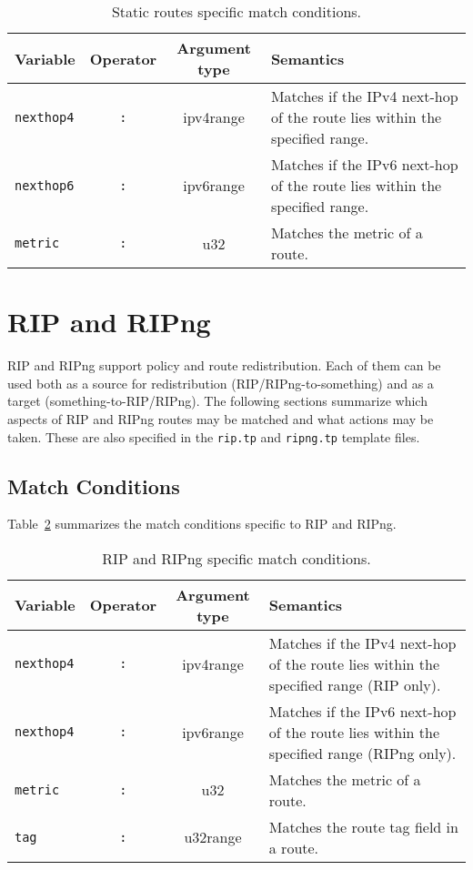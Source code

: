 \begin{table}[h]
\centering
\begin{tabular}{|l|c|c|p{7cm}|}
\hline
Variable & Operator & Argument type & Semantics \\
\hline
\hline
{\tt nexthop4} & {\tt :} & ipv4range & Matches if the IPv4 next-hop of
the route lies within the specified range.\\

\hline
{\tt nexthop6} & {\tt :} & ipv6range & Matches if the IPv6 next-hop of
the route lies within the specified range.\\

\hline
{\tt metric} & {\tt :} & u32 & Matches the metric of a route.\\
\hline

\end{tabular}
\caption{\label{policy_static_match}Static routes specific match conditions.}
\end{table}


\section{RIP and RIPng}

RIP and RIPng support policy and route redistribution.  Each of
them can be used both as a source for redistribution
(RIP/RIPng-to-something) and as a target (something-to-RIP/RIPng). The
following sections summarize which aspects of 
RIP and RIPng routes may be matched and what actions may be taken. These
are also specified in the {\tt rip.tp} and {\tt ripng.tp} template files.

\subsection{Match Conditions}

Table~\ref{policy_rip_match} summarizes the match conditions specific to
RIP and RIPng.

\begin{table}[h]
\centering
\begin{tabular}{|l|c|c|p{7cm}|}
\hline
Variable & Operator & Argument type & Semantics \\
\hline
\hline
{\tt nexthop4} & {\tt :} & ipv4range & Matches if the IPv4 next-hop of
the route lies within the specified range (RIP only).\\

\hline
{\tt nexthop4} & {\tt :} & ipv6range & Matches if the IPv6 next-hop of
the route lies within the specified range (RIPng only).\\

\hline
{\tt metric} & {\tt :} & u32 & Matches the metric of a route.\\

\hline
{\tt tag} & {\tt :} & u32range & Matches the route tag field in a route. \\
\hline

\end{tabular}
\caption{\label{policy_rip_match}RIP and RIPng specific match conditions.}
\end{table}

